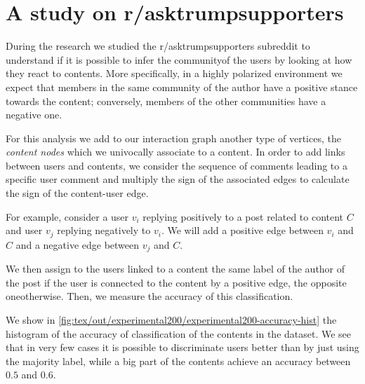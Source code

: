 
\section{A study on r/asktrumpsupporters}%
\label{sec:the_r_asktrumpsupporters_case}

During the research we studied the r/asktrumpsupporters subreddit to
understand if it is possible to infer the community\footnotemark of the users by
looking at how they react to contents. More specifically, in a highly polarized
environment we expect that members in the same community of the
author have a positive stance towards the content; conversely, members of the
other communities have a negative one.


\bigskip

For this analysis we add to our interaction graph another type of vertices, the
\emph{content nodes} which we univocally associate to a content. In order to
add links between users and contents, we consider the sequence of comments
leading to a specific user comment and multiply the sign of the
associated edges to calculate the sign of the content-user edge.

For example, consider a user $v_i$
replying positively to a post related to content $C$ and user $v_j$ replying
negatively to $v_i$. We will add a positive edge between $v_i$ and $C$ and a
negative edge between $v_j$ and $C$.

We then assign to the users linked to a content the same label of the author of
the post if the user is connected to the content
by a positive edge, the opposite one\footnotemark otherwise. Then, we measure the accuracy of
this classification.


We show in \autoref{fig:tex/out/experimental200/experimental200-accuracy-hist}
the histogram of the accuracy of classification of the contents in the dataset.
We see that in very few cases it is possible to discriminate users better than
by just using the majority label, while a big part of the contents achieve an
accuracy between $0.5$ and $0.6$.

